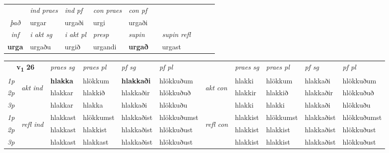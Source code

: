 \begin{tabular}{lllllllllll}
   & &  \textit{ind praes} & \textit{ind pf} & \textit{con praes} & \textit{con pf} \\*
\multicolumn{2}{c}{ \textit{það} } & urgar & urgaði & urgi & urgaði \\*

\cmidrule{3-8}
   \multicolumn{2}{c}{\textit{inf}}  & \textit{i akt sg} & \textit{i akt pl}   & \textit{presp} & \textit{supin} && \textit{supin refl}  \\*
  \multicolumn{2}{c}{\textbf{urga}} & urgaðu  & urgið   & urgandi &  \textbf{urgað} && urgast  \\*
\end{tabular}

\noindent
\begin{tabular}{lllllllllll} \toprule
\multicolumn{2}{c}{\textbf{v{\textsubscript{1}}} \Large{\textbf{26}}}  &  \textit{praes sg}  & \textit{praes pl}  &\textit{ pf sg} & \textit{pf pl} &  &  \textit{praes sg}  & \textit{praes pl}  & \textit{pf sg} & \textit{pf pl } \\*
	\cmidrule{3-6} \cmidrule{8-11}
 {\textit{1p}} & \multirow{3}{*}{\begin{turn}{90}\textit{akt ind}\end{turn}} & \textbf{hlakka} & hlökkum & \textbf{hlakkaði} & hlökkuðum & \multirow{3}{*}{\begin{turn}{90}\textit{akt con}\end{turn}} &hlakki & hlökkum & hlakkaði & hlökkuðum\\*
 {\textit{2p}} &  &  hlakkar  & hlakkið & hlakkaðir & hlökkuðuð & & hlakkir & hlakkið & hlakkaðir & hlökkuðuð \\*
{\textit{3p}} &  & hlakkar & hlakka & hlakkaði & hlökkuðu & & hlakki & hlakki& hlakkaði & hlökkuðu \\*
\cmidrule{3-6} \cmidrule{8-11}
 {\textit{1p}} & \multirow{3}{*}{\begin{turn}{90}\textit{refl ind}\end{turn}}  & hlakkast & hlökkumst & hlakkaðist & hlökkuðumst & \multirow{3}{*}{\begin{turn}{90}\textit{refl con}\end{turn}}  &hlakkist & hlökkumst & hlakkaðist & hlökkuðumst \\*
 {\textit{2p}} &  & hlakkast & hlakkist & hlakkaðist & hlökkuðust & &hlakkist & hlakkist & hlakkaðist & hlökkuðust \\*
 {\textit{3p}}  & & hlakkast & hlakkast & hlakkaðist & hlökkuðust & & hlakkist & hlakkist& hlakkaðist & hlökkuðust \\*
\cmidrule{3-6} \cmidrule{8-11}


\end{tabular}
